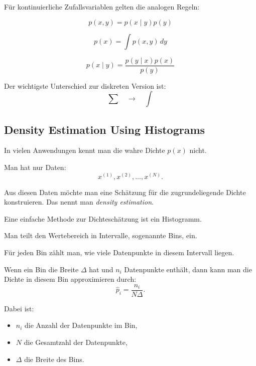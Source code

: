 \documentclass[11pt,a4paper]{scrartcl}
\begin{document}
\begin{answerbox}
    Für kontinuierliche Zufallsvariablen gelten die analogen Regeln:

    \[
        \boxed{
            p(x,y)
            =
            p(x \mid y)p(y)
        }
    \]

    \[
        \boxed{
            p(x)
            =
            \int p(x,y)\,dy
        }
    \]

    \[
        \boxed{
            p(x \mid y)
            =
            \frac{p(y \mid x)p(x)}{p(y)}
        }
    \]

    Der wichtigste Unterschied zur diskreten Version ist:
    \[
        \boxed{
            \sum \quad \longrightarrow \quad \int
        }
    \]
\end{answerbox}

\subsection{Density Estimation Using Histograms}

\begin{notebox}
    In vielen Anwendungen kennt man die wahre Dichte \(p(x)\) nicht.

    Man hat nur Daten:
    \[
        x^{(1)},x^{(2)},\dots,x^{(N)}.
    \]

    Aus diesen Daten möchte man eine Schätzung für die zugrundeliegende Dichte
    konstruieren. Das nennt man \emph{density estimation}.
\end{notebox}

\begin{solutionbox}
    Eine einfache Methode zur Dichteschätzung ist ein Histogramm.

    Man teilt den Wertebereich in Intervalle, sogenannte Bins, ein.

    Für jeden Bin zählt man, wie viele Datenpunkte in diesem Intervall liegen.

    Wenn ein Bin die Breite \(\Delta\) hat und \(n_i\) Datenpunkte enthält,
    dann kann man die Dichte in diesem Bin approximieren durch:
    \[
        \hat p_i
        =
        \frac{n_i}{N\Delta}.
    \]

    Dabei ist:

    \begin{itemize}
        \item \(n_i\) die Anzahl der Datenpunkte im Bin,
        \item \(N\) die Gesamtzahl der Datenpunkte,
        \item \(\Delta\) die Breite des Bins.
    \end{itemize}
\end{solutionbox}
\end{document}
